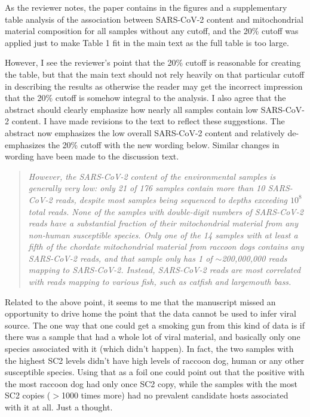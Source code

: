 \documentclass[11pt, oneside]{article}   	%
\newcommand{\response}[1]{{\color{black}#1}}
\begin{document}
\response{
As the reviewer notes, the paper contains in the figures and a supplementary table analysis of the association between SARS-CoV-2 content and mitochondrial material composition for all samples without any cutoff, and the 20\% cutoff was applied just to make Table 1 fit in the main text as the full table is too large.

However, I see the reviewer's point that the 20\% cutoff is reasonable for creating the table, but that the main text should not rely heavily on that particular cutoff in describing the results as otherwise the reader may get the incorrect impression that the 20\% cutoff is somehow integral to the analysis.
I also agree that the abstract should clearly emphasize how nearly all samples contain low SARS-CoV-2 content.
I have made revisions to the text to reflect these suggestions. 
The abstract now emphasizes the low overall SARS-CoV-2 content and relatively de-emphasizes the 20\% cutoff with the new wording below.
Similar changes in wording have been made to the discussion text.
\begin{quote}
\textit{
However, the SARS-CoV-2 content of the environmental samples is generally very low: only 21 of 176 samples contain more than 10 SARS-CoV-2 reads, despite most samples being sequenced to depths exceeding $10^8$  total reads.
None of the samples with double-digit numbers of SARS-CoV-2 reads have a substantial fraction of their mitochondrial material from any non-human susceptible species.
Only one of the 14 samples with at least a fifth of the chordate mitochondrial material from raccoon dogs contains any SARS-CoV-2 reads, and that sample only has 1 of $\sim$200,000,000 reads mapping to SARS-CoV-2.
Instead, SARS-CoV-2 reads are most correlated with reads mapping to various fish, such as catfish and largemouth bass.
}
\end{quote}
}

Related to the above point, it seems to me that the manuscript missed an opportunity to drive home the point that the data cannot be used to infer viral source.  The one way that one could get a smoking gun from this kind of data is if there was a sample that had a whole lot of viral material, and basically only one species associated with it (which didn’t happen).  In fact, the two samples with the highest SC2 levels didn’t have high levels of raccoon dog, human or any other susceptible species.  Using that as a foil one could point out that the positive with the most raccoon dog had only once SC2 copy, while the samples with the most SC2 copies ($>$1000 times more) had no prevalent candidate hosts associated with it at all.  Just a thought.
\end{document}
